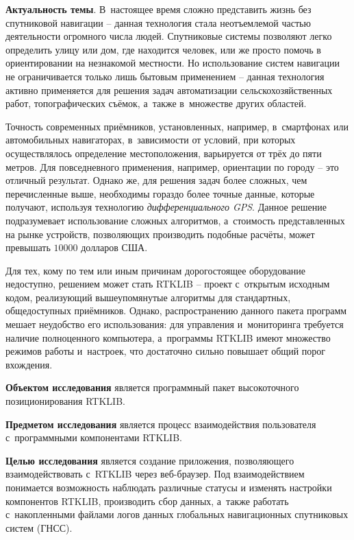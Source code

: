 
\textbf{Актуальность темы}. В~настоящее время сложно представить жизнь без спутниковой навигации -- данная технология стала неотъемлемой частью деятельности огромного числа людей. Спутниковые системы позволяют легко определить улицу или дом, где находится человек, или же просто помочь в ориентировании на незнакомой местности. Но использование систем навигации не ограничивается только лишь бытовым применением -- данная технология активно применяется для решения задач автоматизации сельскохозяйственных работ, топографических съёмок, а~также в~множестве других областей. \par

Точность современных приёмников, установленных, например, в~смартфонах или автомобильных навигаторах, в~зависимости от условий, при которых осуществлялось определение местоположения, варьируется от трёх до пяти метров. Для повседневного применения, например, ориентации по городу -- это отличный результат. Однако же, для решения задач более сложных, чем перечисленные выше, необходимы гораздо более точные данные, которые получают, используя технологию \textit{дифференциального GPS}. Данное решение подразумевает использование сложных алгоритмов, а~стоимость представленных на рынке устройств, позволяющих производить подобные расчёты, может превышать $10000$ долларов США. \par

Для тех, кому по тем или иным причинам дорогостоящее оборудование недоступно, решением может стать RTKLIB -- проект с~открытым исходным кодом, реализующий вышеупомянутые алгоритмы для стандартных, общедоступных приёмников. Однако, распространению данного пакета программ мешает неудобство его использования: для управления и~мониторинга требуется наличие полноценного компьютера, а~программы RTKLIB имеют множество режимов работы и~настроек, что достаточно сильно повышает общий порог вхождения. \par

\textbf{Объектом исследования} является программный пакет высокоточного позиционирования RTKLIB. \par

\textbf{Предметом исследования} является процесс взаимодействия пользователя с~программными компонентами RTKLIB. \par

\textbf{Целью исследования} является создание приложения, позволяющего взаимодействовать с~RTKLIB через веб-браузер. Под взаимодействием понимается возможность наблюдать различные статусы и изменять настройки компонентов RTKLIB, производить сбор данных, а~также работать с~накопленными файлами логов данных глобальных навигационных спутниковых систем (ГНСС). \par

